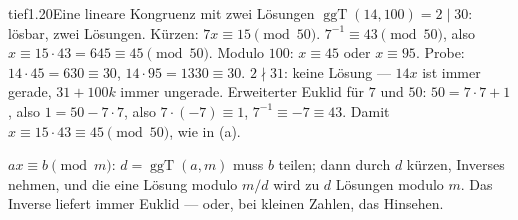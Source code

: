\begin{loesungkarte}{tief}{1.20}{Eine lineare Kongruenz mit zwei Lösungen}
$\operatorname{ggT}(14, 100) = 2\mid30$: lösbar, zwei Lösungen. Kürzen: $7x\equiv15\pmod{50}$. $7^{-1}\equiv43\pmod{50}$, also $x\equiv15\cdot43 = 645\equiv45\pmod{50}$. Modulo $100$: $x\equiv45$ oder $x\equiv95$. Probe: $14\cdot45 = 630\equiv30$, $14\cdot95 = 1330\equiv30$. \checkmark
{}
$2\nmid31$: keine Lösung --- $14x$ ist immer gerade, $31 + 100k$ immer ungerade.
Erweiterter Euklid für $7$ und $50$: $50 = 7\cdot7 + 1$, also $1 = 50 - 7\cdot7$, also $7\cdot(-7)\equiv1$, $7^{-1}\equiv-7\equiv43$. Damit $x\equiv15\cdot43\equiv45\pmod{50}$, wie in (a).
\begin{mitnehmen}\kastentext
$ax\equiv b\pmod m$: $d = \operatorname{ggT}(a, m)$ muss $b$ teilen; dann durch $d$ kürzen, Inverses nehmen, und die eine Lösung modulo $m/d$ wird zu $d$ Lösungen modulo $m$. Das Inverse liefert immer Euklid --- oder, bei kleinen Zahlen, das Hinsehen.
\end{mitnehmen}
\end{loesungkarte}

